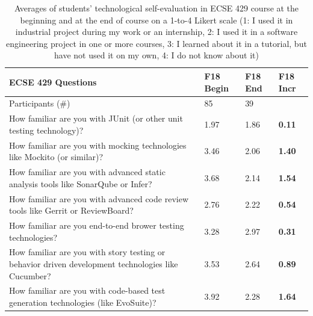 \documentclass[a4paper,11pt]{report}
\begin{document}
\begin{table}[htb]
\footnotesize
\begin{tabular}{@{}p{12cm}p{1cm}p{1cm}p{1cm}@{}}
\toprule
\textbf{ECSE 429 Questions} & 
\textbf{F18} \newline \textbf{Begin} & 
\textbf{F18} \newline \textbf{End} & 
\textbf{F18} \newline \textbf{Incr} \\ \toprule
Participants (\#) & 85 & 39  \\ \midrule
How familiar are you with JUnit (or other unit testing technology)? & 1.97 & 1.86 & \textbf{0.11} \\ \midrule

How familiar are you with mocking technologies like Mockito (or similar)? & 3.46 & 2.06 & \textbf{1.40} \\ \midrule

How familiar are you with advanced static analysis tools like SonarQube or Infer? & 3.68 & 2.14 & \textbf{1.54} \\ \midrule

How familiar are you with advanced code review tools like Gerrit or ReviewBoard? & 2.76 & 2.22 & \textbf{0.54} \\ \midrule

How familiar are you end-to-end brower testing technologies? & 3.28 & 2.97 & \textbf{0.31}  \\ \midrule

How familiar are you with story testing or behavior driven development technologies like Cucumber? &
3.53 & 2.64 & \textbf{0.89}  \\ \midrule


How familiar are you with code-based test generation technologies (like EvoSuite)?
& 3.92 & 2.28 & \textbf{1.64} \\ \midrule
\bottomrule
\end{tabular}

\caption{Averages of students' technological self-evaluation in ECSE 429 course at the beginning and at the end of course on a 1-to-4 Likert scale (1: I used it in industrial project during my work or an internship, 2: I used it in a software engineering project in one or more courses, 3: I learned about it in a tutorial, but have not used it on my own, 4:
I do not know about it)}
\label{tab:tech-eval-ecse429}
\end{table}
\end{document}
